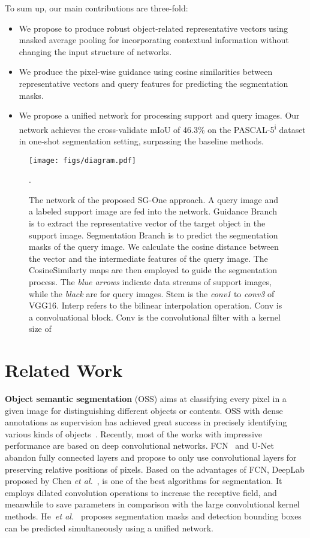 \documentclass[journal]{IEEEtran}
\newcommand{\etal}{\emph{et al.}}
\begin{document}
To sum up, our main contributions are three-fold:
\begin{itemize}
\item We propose to produce robust object-related representative vectors using masked average pooling for incorporating contextual information without changing the input structure of networks.  
\item We produce the pixel-wise guidance using cosine similarities between representative vectors and query features for predicting the segmentation masks. 
\item We propose a unified network for processing support and query images. Our network achieves the cross-validate mIoU of 46.3\% on the PASCAL-5\textsuperscript{i} dataset in one-shot segmentation setting, surpassing the baseline methods.
\end{itemize}


\begin{figure*}[htp]
  \centering
  \texttt{[image: figs/diagram.pdf]}
  \caption{The network of the proposed SG-One approach. A query image and a labeled support image are fed into the network. Guidance Branch is to extract the representative vector of the target object in the support image. Segmentation Branch is to predict the segmentation masks of the query image. We calculate the cosine distance between the vector and the intermediate features of the query image. The CosineSimilarty maps are then employed to guide the segmentation process. 
  The \textit{blue arrows} indicate data streams of support images, while the \textit{black} are for query images.
  Stem is the \textit{conv1} to \textit{conv3} of VGG16. Interp refers to the bilinear interpolation operation. Conv is a convoluational block. Conv  is the convolutional filter with a kernel size of }.
  \label{fig-1}
\vspace{-3mm}
\end{figure*}
\section{Related Work}
\textbf{Object semantic segmentation} (OSS) aims at classifying every pixel in a given image for distinguishing different objects or contents. 
OSS with dense annotations as supervision has achieved great success in precisely identifying various kinds of objects~\cite{husain2014consistent,yang2014scale, peng2015high,nie20183,wang2018hybrid,ben2019coupled,cheng2019spgnet,huang2018ccnet}.
Recently, most of the works with impressive performance are based on deep convolutional networks. 
FCN~\cite{2015-long} and U-Net~\cite{ronneberger2015u} abandon fully connected layers and propose to only use convolutional layers for preserving relative positions of pixels.
Based on the advantages of FCN, DeepLab proposed by Chen \etal~\cite{chen2014semantic,chen2018encoder}, is one of the best algorithms for segmentation.
It employs dilated convolution operations to increase the receptive field, and meanwhile to save parameters in comparison with the large convolutional kernel methods.
He~\etal~\cite{he2017mask} proposes segmentation masks and detection bounding boxes can be predicted simultaneously using a unified network.
\end{document}
